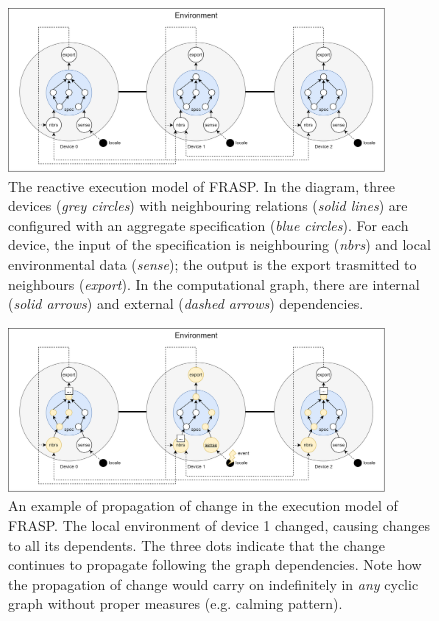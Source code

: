\begin{figure}[!ht]
  \centering
  \includegraphics[width=0.89\textwidth]{resources/figures/frasp-simulation.png}
  \caption{
    The reactive execution model of FRASP. In the diagram, three
    devices (\textit{grey circles}) with neighbouring relations (\textit{solid
      lines}) are configured with an aggregate specification (\textit{blue
      circles}). For each device, the input of the specification is
    neighbouring (\textit{nbrs}) and local environmental data (\textit{sense});
    the output is the export trasmitted to neighbours (\textit{export}). In the
    computational graph, there are internal (\textit{solid arrows}) and
    external (\textit{dashed arrows}) dependencies.
  }
  \label{figure:frasp-simulation}
\end{figure}

\begin{figure}[!ht]
  \centering
  \includegraphics[width=0.89\textwidth]{resources/figures/frasp-simulation-example.png}
  \caption{
    An example of propagation of change in the execution model of FRASP. The
    local environment of device 1 changed, causing changes to all its
    dependents. The three dots indicate that the change continues to
    propagate following the graph dependencies. Note how the
    propagation of change would carry on indefinitely in \textit{any} cyclic
    graph without proper measures (e.g. calming pattern).
  }
  \label{figure:frasp-simulation-example}
\end{figure}

